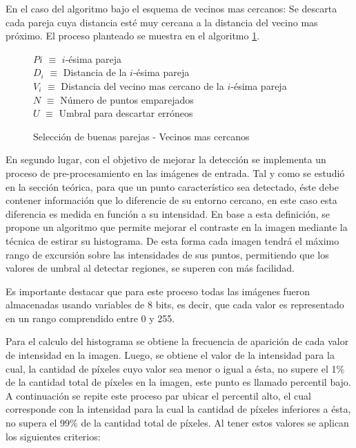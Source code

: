 En el caso del algoritmo bajo el esquema de vecinos mas cercanos: Se descarta cada pareja cuya distancia esté muy cercana a la distancia del vecino mas próximo. El proceso planteado se muestra en el algoritmo \ref{vecinosmascercanos}.

\begin{figure}[h]
	\centering
	\begin{minipage}{.75\linewidth}
		\begin{algorithm}[H] %
			\caption{Selección de buenas parejas - Vecinos mas cercanos}
			\label{vecinosmascercanos}
			\SetAlgoLined
			$P{i}$ $\equiv$ $i$-ésima pareja\\
			$D_{i}$ $\equiv$ Distancia de la $i$-ésima pareja\\
			$V_{i}$ $\equiv$ Distancia del vecino mas cercano de la $i$-ésima pareja\\
			$N$ $\equiv$ Número de puntos emparejados\\
			$U$ $\equiv$ Umbral para descartar erróneos\\
		\end{algorithm}
	\end{minipage}
\end{figure}

En segundo lugar, con el objetivo de mejorar la detección se implementa un proceso de pre-procesamiento en las imágenes de entrada. Tal y como se estudió en la sección teórica, para que un punto característico sea detectado, éste debe contener información que lo diferencie de su entorno cercano, en este caso esta diferencia es medida en función a su intensidad. En base a esta definición, se propone un algoritmo que permite mejorar el contraste en la imagen mediante la técnica de estirar su histograma. De esta forma cada imagen tendrá el máximo rango de excursión sobre las intensidades de sus puntos, permitiendo que los valores de umbral al detectar regiones, se superen con más facilidad.

Es importante destacar que para este proceso todas las imágenes fueron almacenadas usando variables de 8 bits, es decir, que cada valor es representado en un rango comprendido entre 0 y 255.

Para el calculo del histograma se obtiene la frecuencia de aparición de cada valor de intensidad en la imagen. Luego, se obtiene el valor de la intensidad para la cual, la cantidad de píxeles cuyo valor sea menor o igual a ésta, no supere el 1\% de la cantidad total de píxeles en la imagen, este punto es llamado percentil bajo. A continuación se repite este proceso par ubicar el percentil alto, el cual corresponde con la intensidad para la cual la cantidad de píxeles inferiores a ésta, no supera el 99\% de la cantidad total de píxeles. Al tener estos valores se aplican los siguientes criterios:

